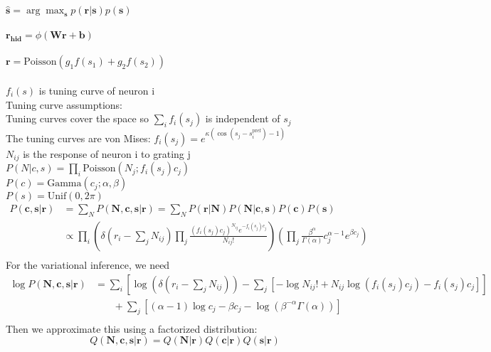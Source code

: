 \documentclass[12pt]{article}
\begin{document}
$\hat{\mathbf{s}} = \arg\max_\mathbf{s} p(\mathbf{r|s}) p(\mathbf{s})$
\\
\\
$\mathbf{r_\text{hid}} = \phi (\mathbf{Wr + b})$
\\
\\
$\mathbf{r} = \text{Poisson} (g_1f (s_1) + g_2f(s_2))$
\\
\\
$f_i(s)$ is tuning curve of neuron i\\
Tuning curve assumptions:\\
Tuning curves cover the space so $\sum_i f_i(s_j)$ is independent of $s_j$\\
The tuning curves are von Mises: $f_i(s_j) = e^{\kappa(\cos(s_j - s_i^{\text{pref}}) - 1)}$\\
$N_{ij}$ is the response of neuron i to grating j\\
$P(N|c, s) = \prod_i \text{Poisson}(N_{j}; f_i(s_j)c_j)$\\
$P(c) = \text{Gamma}(c_j; \alpha, \beta)$\\
$P(s) = \text{Unif}(0, 2\pi)$\\
\begin{equation}
\begin{aligned}
P(\mathbf{c, s|r}) & = \sum_N P(\mathbf{N, c, s|r}) = \sum_N P(\mathbf{r|N}) P(\mathbf{N|c, s}) P(\mathbf{c}) P(\mathbf{s})\\
&\propto \prod_i (\delta(r_i - \sum_j N_{ij}) \prod_j\frac{(f_i(s_j)c_j)^{N_{ij}} e^{-f_i(s_j) c_j}}{N_{ij}!}) (\prod_j \frac{\beta^{\alpha}}{\Gamma(\alpha)} c_j^{\alpha - 1}e^{\beta c_j})\\
\end{aligned}
\end{equation}
For the variational inference, we need\\
\begin{equation}
\begin{aligned}
\log P(\mathbf{N, c, s| r}) &= \sum_i [\log(\delta(r_i - \sum_j N_{ij})) - \sum_j [- \log N_{ij}! + N_{ij} \log(f_i(s_j)c_j) - f_i(s_j) c_j]]\\
& \phantom{{}=1} + \sum_j[(\alpha - 1) \log c_j - \beta c_j - \log (\beta^{- \alpha} \Gamma (\alpha))]\\
\end{aligned}
\end{equation}
Then we approximate this using a factorized distribution:\\
\begin{equation}
Q(\mathbf{N, c, s|r}) = Q(\mathbf{N|r}) Q(\mathbf{c|r}) Q(\mathbf{s|r})
\end{equation}
\end{document}
